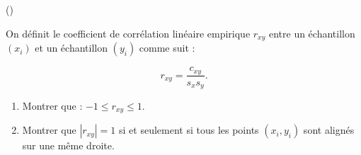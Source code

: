 \begin{exercice}\label{exo2-5} (\mortelexo)

On d\'efinit le coefficient de corr\'elation lin\'eaire empirique $r_{xy}$
entre un \'echantillon $(x_i)$ et un \'echantillon $(y_i)$ comme suit :

\[ r_{xy} = \frac{c_{xy}}{s_x s_y}. \]

\begin{enumerate}

\item Montrer que : $ - 1 \leq r_{xy} \leq 1 $.

\item Montrer que $| r_{xy} | = 1$ si et seulement si tous les points $(x_i,y_i)$
sont align\'es sur une m\^eme droite.

\end{enumerate}

\end{exercice}
